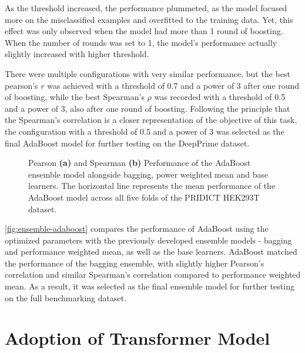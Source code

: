 As the threshold increased, the performance plummeted, as the model focused more on the misclassified examples and overfitted to the training data. Yet, this effect was only observed when the model had more than 1 round of boosting. When the number of rounds was set to 1, the model's performance actually slightly increased with higher threshold. 

There were multiple configurations with very similar performance, but the best pearson's $r$ was achieved with a threshold of 0.7 and a power of 3 after one round of boosting, while the best Spearman's $\rho$ was recorded with a threshold of 0.5 and a power of 3, also after one round of boosting. Following the principle that the Spearman's correlation is a closer representation of the objective of this task, the configuration with a threshold of 0.5 and a power of 3 was selected as the final AdaBoost model for further testing on the DeepPrime dataset.

\begin{figure}
    \centering
    \caption[AdaBoost Ensemble Model Performance]{Pearson \textbf{(a)} and Spearman \textbf{(b)} Performance of the AdaBoost ensemble model alongside bagging, power weighted mean and base learners. The horizontal line represents the mean performance of the AdaBoost model across all five folds of the PRIDICT HEK293T dataset.}
    \label{fig:ensemble-adaboost}
\end{figure}

\autoref{fig:ensemble-adaboost} compares the performance of AdaBoost using the optimized parameters with the previously developed ensemble models - bagging and performance weighted mean, as well as the base learners. AdaBoost matched the performance of the bagging ensemble, with slightly higher Pearson's correlation and similar Spearman's correlation compared to performance weighted mean. As a result, it was selected as the final ensemble model for further testing on the full benchmarking dataset.

\section{Adoption of Transformer Model}

